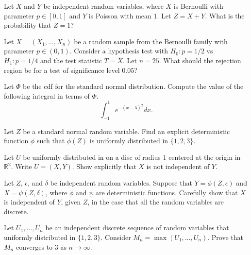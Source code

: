 \documentclass[
]{article}
\begin{document}
\begin{exercise}
Let $X$ and $Y$ be independent random variables, where $X$ is Bernoulli with parameter $p \in [0,1]$ and $Y$ is Poisson with mean $1$.   Let $Z = X+Y$.  What is the probability that $Z=1$?  
\end{exercise}

\begin{exercise}
Let $X = (X_1, \ldots, X_n)$ be a random sample from the Bernoulli family with parameter $p \in (0,1)$.  Consider a hypothesis test with $H_0: p =1/2$ vs $H_1: p =1/4$ and the test statistic $T= \bar{X}$.  Let $n=25$.  What should the rejection region be for a test of significance level $0.05$?
\end{exercise}

\begin{exercise} Let $\Phi$ be the cdf for the standard normal distribution.  Compute the value of the following integral in terms of $\Phi$.
$$\int_{-1} ^{1}   e^{-(x-5)^2} dx.$$

\end{exercise}

\begin{exercise}
Let $Z$ be a standard normal random variable.   Find an explicit deterministic function $\phi$ such that $\phi(Z)$ is uniformly distributed in $\{1,2,3\}.$
    
\end{exercise}

\begin{exercise}
Let $U$ be uniformly distributed in on a disc of radius $1$ centered at the origin in $\mathbb{R}^2$.   Write $U = (X,Y)$.   Show explicitly that $X$ is not independent of $Y$.   
    
\end{exercise}

\begin{exercise}
 Let $Z$,  $\epsilon$, and $\delta$ be independent random variables.  Suppose that $Y = \phi(Z, \epsilon)$ and $X = \psi(Z, \delta)$, where $\phi$ and $\psi$ are deterministic functions.   Carefully show  that $X$ is independent of $Y$, given $Z$, in the case that all the random variables are discrete.  
\end{exercise}

\begin{exercise}
Let $U_1, \ldots, U_n$ be an independent discrete sequence of random variables that uniformly distributed in $\{1,2,3\}$.  Consider $M_n = \max(U_1, \ldots, U_n)$.  Prove that $M_n$ converges to $3$ as $n \to \infty$. 
    
\end{exercise}
\end{document}
